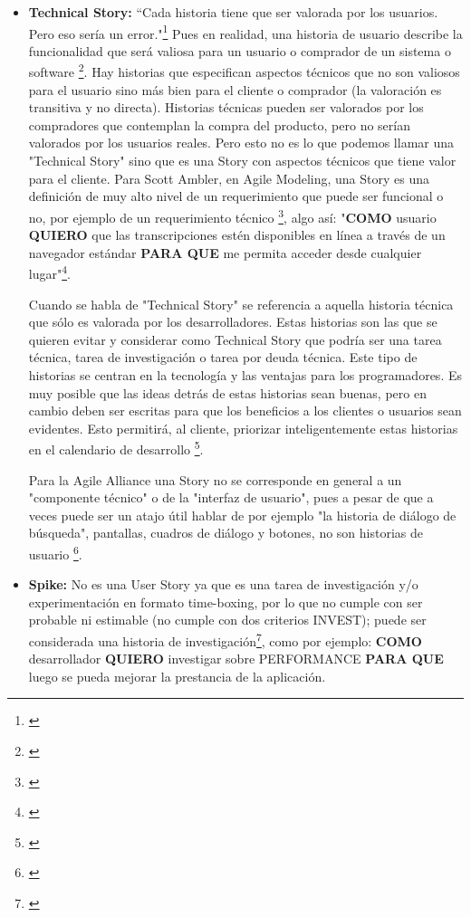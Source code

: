 \begin{itemize}

\item \textbf{Technical Story:}
“Cada historia tiene que ser valorada por los usuarios. Pero eso sería un error."\footnote{\cite{Cohn-2004}} Pues en realidad, una historia de usuario describe la funcionalidad que será valiosa para un usuario o comprador de un sistema o software \footnote{\cite{Cohn-2004}}. Hay historias que especifican aspectos técnicos que no son valiosos para el usuario sino más bien para el cliente o comprador (la valoración es transitiva y no directa). Historias técnicas pueden ser valorados por los compradores que contemplan la compra del producto, pero no serían valorados por los usuarios reales. Pero esto no es lo que podemos llamar una "Technical Story" sino que es una Story con aspectos técnicos que tiene valor para el cliente. Para Scott Ambler, en Agile Modeling, una Story es una definición de muy alto nivel de un requerimiento que puede ser funcional o no, por ejemplo de un requerimiento técnico \footnote{\cite{Scott-Ambler-2015}}, algo así: "\textbf{COMO} usuario \textbf{QUIERO} que las transcripciones estén disponibles en línea a través de un navegador estándar \textbf{PARA QUE} me permita acceder desde cualquier lugar"\footnote{\cite{Scott-Ambler-2015}}.

Cuando se habla de "Technical Story" se referencia a aquella historia técnica que sólo es valorada por los desarrolladores. Estas historias son las que se quieren evitar y considerar como Technical Story que podría ser una tarea técnica, tarea de investigación o tarea por deuda técnica. Este tipo de historias se centran en la tecnología y las ventajas para los programadores. Es muy posible que las ideas detrás de estas historias sean buenas, pero en cambio deben ser escritas para que los beneficios a los clientes o usuarios sean evidentes. Esto permitirá, al cliente, priorizar inteligentemente estas historias en el calendario de desarrollo \footnote{\cite{Cohn-2004}}.

Para la Agile Alliance una Story no se corresponde en general a un "componente técnico" o de la "interfaz de usuario", pues a pesar de que a veces puede ser un atajo útil hablar de por ejemplo "la historia de diálogo de búsqueda", pantallas, cuadros de diálogo y botones, no son historias de usuario \footnote{\cite{Scrum-Alliance-2015}}.

\item \textbf{Spike:}
No es una User Story ya que es una tarea de investigación y/o experimentación en formato time-boxing, por lo que no cumple con ser probable ni estimable (no cumple con dos criterios INVEST); puede ser considerada una historia de investigación\footnote{\cite{Cohn-2004}}, como por ejemplo: \textbf{COMO} desarrollador \textbf{QUIERO} investigar sobre PERFORMANCE \textbf{PARA QUE} luego se pueda mejorar la prestancia de la aplicación.\newline


\end{itemize}
